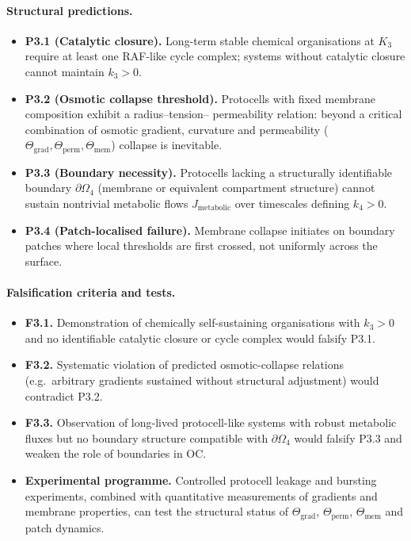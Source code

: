 \paragraph{Structural predictions.}
\begin{itemize}
  \item \textbf{P3.1 (Catalytic closure).}
        Long-term stable chemical organisations at \(K_3\) require at least
        one RAF-like cycle complex; systems without catalytic closure cannot
        maintain \(k_3>0\).
  \item \textbf{P3.2 (Osmotic collapse threshold).}
        Protocells with fixed membrane composition exhibit a radius–tension–
        permeability relation: beyond a critical combination of osmotic
        gradient, curvature and permeability
        (\(\Theta_{\mathrm{grad}}, \Theta_{\mathrm{perm}}, \Theta_{\mathrm{mem}}\))
        collapse is inevitable.
  \item \textbf{P3.3 (Boundary necessity).}
        Protocells lacking a structurally identifiable boundary
        \(\partial\Omega_4\) (membrane or equivalent compartment structure)
        cannot sustain nontrivial metabolic flows \(J_{\mathrm{metabolic}}\)
        over timescales defining \(k_4>0\).
  \item \textbf{P3.4 (Patch-localised failure).}
        Membrane collapse initiates on boundary patches where local thresholds
        are first crossed, not uniformly across the surface.
\end{itemize}

\paragraph{Falsification criteria and tests.}
\begin{itemize}
  \item \textbf{F3.1.}
        Demonstration of chemically self-sustaining organisations with
        \(k_3>0\) and no identifiable catalytic closure or cycle complex
        would falsify P3.1.
  \item \textbf{F3.2.}
        Systematic violation of predicted osmotic-collapse relations (e.g.\
        arbitrary gradients sustained without structural adjustment) would
        contradict P3.2.
  \item \textbf{F3.3.}
        Observation of long-lived protocell-like systems with robust
        metabolic fluxes but no boundary structure compatible with
        \(\partial\Omega_4\) would falsify P3.3 and weaken the role of
        boundaries in OC.
  \item \textbf{Experimental programme.}
        Controlled protocell leakage and bursting experiments, combined
        with quantitative measurements of gradients and membrane properties,
        can test the structural status of \(\Theta_{\mathrm{grad}}\),
        \(\Theta_{\mathrm{perm}}\), \(\Theta_{\mathrm{mem}}\) and patch
        dynamics.
\end{itemize}

